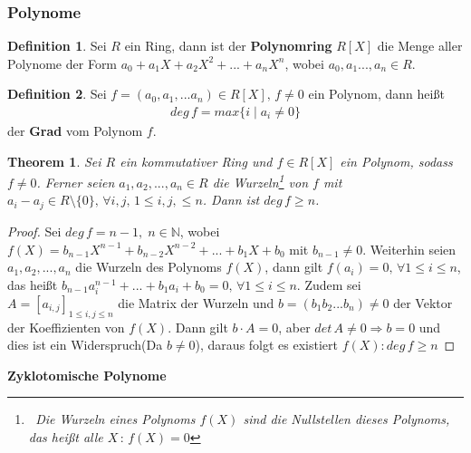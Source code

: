 \documentclass[12pt,oneside]{article}
\newtheorem{theorem}{Theorem}[section]
\theoremstyle{remark}
\theoremstyle{definition}
\newtheorem{definition}{Definition}[section]
\begin{document}
\subsubsection{Polynome}

\begin{definition}
Sei $R$ ein Ring, dann ist der \textbf{Polynomring} $R[X]$ die Menge aller Polynome der Form $a_{0} + a_{1}X + a_{2} X^2 + ... + a_{n}X^n$, wobei $a_{0},a_{1}...,a_{n} \in R$.
\end{definition}

\smallskip

\begin{definition}
Sei $f = (a_0, a_1,...a_n) \in R[X], \, f \neq 0 $ ein Polynom, dann heißt
\begin{align*}
    deg \, f = max \{ i  \mid a_i \neq 0 \}
\end{align*}
der \textbf{Grad} vom Polynom $f$.  
\end{definition}

\smallskip

\begin{theorem}\label{number_of_roots}
Sei $R$ ein kommutativer Ring und $f \in R[X]$ ein Polynom, sodass $f \neq 0$. Ferner seien $a_1, a_2,...,a_n \in R$ die Wurzeln\footnote{$\,$ Die Wurzeln eines Polynoms $f(X)$ sind die Nullstellen dieses Polynoms, das heißt alle $X \, : \, f(X) = 0$ } von $f$ mit $a_i - a_j \in R\setminus\{0\} , \, \forall i,j, \, 1 \leq i,j, \leq n$. Dann ist $deg \, f \geq n$.
\end{theorem}

\begin{proof}
Sei $deg \, f = n - 1, \; n \in \mathbb{N}$, wobei $f(X) = b_{n-1}X^{n-1} + b_{n-2}X^{n-2} + ... + b_1 X + b_0$ mit $b_{n-1} \neq 0$. Weiterhin seien $a_1,a_2,...,a_{n}$ die Wurzeln des Polynoms $f(X)$, dann gilt $f(a_i) = 0, \, \forall 1 \leq i \leq n$, das heißt $b_{n-1} a_i^{n-1} +...+ b_1 a_i + b_0 = 0, \, \forall 1 \leq i \leq n$. \newline\newline Zudem sei $A = [a_{i,j}]_{1 \leq i,j \leq n}$ die Matrix der Wurzeln und $b = (b_1 b_2 ...b_{n}) \neq 0$ der Vektor der Koeffizienten von $f(X)$. Dann gilt $b \cdot A = 0$, aber $det \, A \neq 0 \Rightarrow  b = 0$ und dies ist ein Widerspruch(Da $b \neq 0$), daraus folgt es existiert $f(X) : deg \, f \geq n$  
\end{proof}

\smallskip

\textbf{Zyklotomische Polynome}
\end{document}

